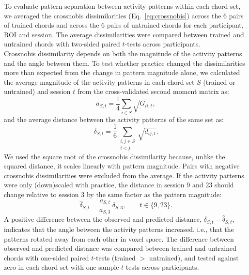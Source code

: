 \documentclass{article}
\begin{document}
To evaluate pattern separation between activity patterns within each chord set, we averaged the crossnobis dissimilarities (Eq.~\ref{eq:crossnobis}) across the 6 pairs of trained chords and across the 6 pairs of untrained chords for each participant, ROI and session. The average dissimilarities were compared between trained and untrained chords with two-sided paired $t$-tests across participants. \\

Crossnobis dissimilarity depends on both the magnitude of the activity patterns and the angle between them. To test whether practice changed the dissimilarities more than expected from the change in pattern magnitude alone, we calculated the average magnitude of the activity patterns in each chord set $S$ (trained or untrained) and session $t$ from the cross-validated second moment matrix as:
\begin{equation}
    a_{S,t} = \frac{1}{4} \sum_{i \in S} \sqrt{G_{ii,t}},
\end{equation}
and the average distance between the activity patterns of the same set as:
\begin{equation}
    \delta_{S,t} = \frac{1}{6} \sum_{\substack{i, j \in S \\ i < j}} \sqrt{d_{ij,t}}.
\end{equation}
We used the square root of the crossnobis dissimilarity because, unlike the squared distance, it scales linearly with pattern magnitude. Pairs with negative crossnobis dissimilarities were excluded from the average. If the activity patterns were only (down)scaled with practice, the distance in session 9 and 23 should change relative to session 3 by the same factor as the pattern magnitude:
\begin{equation}
    \hat{\delta}_{S,t} = \frac{a_{S,t}}{a_{S,3}}\, \delta_{S,3},
    \qquad t \in \{9, 23\}.
\end{equation}
A positive difference between the observed and predicted distance, $\delta_{S,t} - \hat{\delta}_{S,t}$, indicates that the angle between the activity patterns increased, i.e., that the patterns rotated away from each other in voxel space. The difference between observed and predicted distance was compared between trained and untrained chords with one-sided paired $t$-tests (trained $>$ untrained), and tested against zero in each chord set with one-sample $t$-tests across participants. \\
\end{document}
